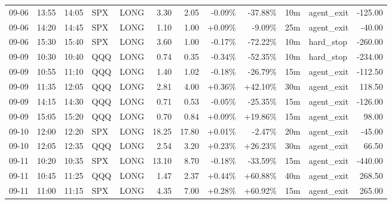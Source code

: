 \documentclass[11pt,a4paper]{article}
\begin{document}
\begin{center}
\begin{longtable}{>{\color{txtmain}}l l l l l r r r r r >{\color{txtmain}}l r}
09-06 & 13:55 & 14:05 & SPX & LONG & 3.30 & 2.05 & \textcolor{lossred}{-0.09\%} & \textcolor{lossred}{-37.88\%} & 10m & agent\_exit & \textcolor{lossred}{-125.00} \\
09-06 & 14:20 & 14:45 & SPX & LONG & 1.10 & 1.00 & \textcolor{wingreen}{+0.09\%} & \textcolor{lossred}{-9.09\%} & 25m & agent\_exit & \textcolor{lossred}{-40.00} \\
09-06 & 15:30 & 15:40 & SPX & LONG & 3.60 & 1.00 & \textcolor{lossred}{-0.17\%} & \textcolor{lossred}{-72.22\%} & 10m & hard\_stop & \textcolor{lossred}{-260.00} \\
09-09 & 10:30 & 10:40 & QQQ & LONG & 0.74 & 0.35 & \textcolor{lossred}{-0.34\%} & \textcolor{lossred}{-52.35\%} & 10m & hard\_stop & \textcolor{lossred}{-234.00} \\
09-09 & 10:55 & 11:10 & QQQ & LONG & 1.40 & 1.02 & \textcolor{lossred}{-0.18\%} & \textcolor{lossred}{-26.79\%} & 15m & agent\_exit & \textcolor{lossred}{-112.50} \\
09-09 & 11:35 & 12:05 & QQQ & LONG & 2.81 & 4.00 & \textcolor{wingreen}{+0.36\%} & \textcolor{wingreen}{+42.10\%} & 30m & agent\_exit & \textcolor{wingreen}{118.50} \\
09-09 & 14:15 & 14:30 & QQQ & LONG & 0.71 & 0.53 & \textcolor{lossred}{-0.05\%} & \textcolor{lossred}{-25.35\%} & 15m & agent\_exit & \textcolor{lossred}{-126.00} \\
09-09 & 15:05 & 15:20 & QQQ & LONG & 0.70 & 0.84 & \textcolor{wingreen}{+0.09\%} & \textcolor{wingreen}{+19.86\%} & 15m & agent\_exit & \textcolor{wingreen}{98.00} \\
09-10 & 12:00 & 12:20 & SPX & LONG & 18.25 & 17.80 & \textcolor{wingreen}{+0.01\%} & \textcolor{lossred}{-2.47\%} & 20m & agent\_exit & \textcolor{lossred}{-45.00} \\
09-10 & 12:05 & 12:35 & QQQ & LONG & 2.54 & 3.20 & \textcolor{wingreen}{+0.23\%} & \textcolor{wingreen}{+26.23\%} & 30m & agent\_exit & \textcolor{wingreen}{66.50} \\
09-11 & 10:20 & 10:35 & SPX & LONG & 13.10 & 8.70 & \textcolor{lossred}{-0.18\%} & \textcolor{lossred}{-33.59\%} & 15m & agent\_exit & \textcolor{lossred}{-440.00} \\
09-11 & 10:45 & 11:25 & QQQ & LONG & 1.47 & 2.37 & \textcolor{wingreen}{+0.44\%} & \textcolor{wingreen}{+60.88\%} & 40m & agent\_exit & \textcolor{wingreen}{268.50} \\
09-11 & 11:00 & 11:15 & SPX & LONG & 4.35 & 7.00 & \textcolor{wingreen}{+0.28\%} & \textcolor{wingreen}{+60.92\%} & 15m & agent\_exit & \textcolor{wingreen}{265.00} \\

\end{longtable}
\end{center}
\end{document}
